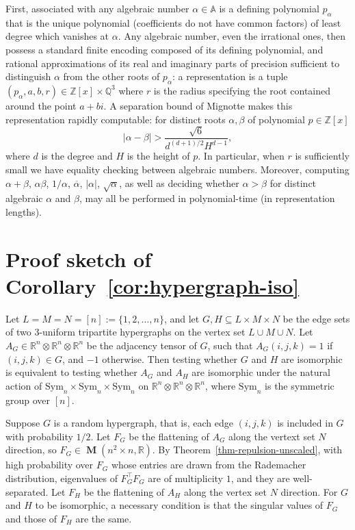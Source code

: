 \documentclass[11pt]{article}
\numberwithin{equation}{section}
\theoremstyle{remark}
\DeclareMathOperator{\M}{\textbf{M}}
\renewcommand{\AA}{\mathbb{A}}
\newcommand{\RR}{\mathbb{R}}
\newcommand{\Sym}{\mathrm{Sym}}
\begin{document}
First, associated with any algebraic number $\alpha \in \AA$ is a defining polynomial $p_\alpha$ that is the unique polynomial (coefficients do not have common factors) of least degree which vanishes at $\alpha$. Any algebraic number, even the irrational ones, then possess a standard finite encoding composed of its defining polynomial, and rational approximations of its real and imaginary parts of precision sufficient to distinguish $\alpha$ from the other roots of $p_\alpha$: a representation is a tuple $(p_\alpha, a, b, r) \in \mathbb{Z}[x] \times \mathbb{Q}^3$ where $r$ is the radius specifying the root contained around the point $a+bi$. A separation bound of Mignotte \cite{mignotte1982some} makes this representation rapidly computable:
for distinct roots $\alpha, \beta$ of polynomial $p \in \mathbb{Z}[x]$
\[
|\alpha - \beta| > \frac{\sqrt{6}}{d^{(d+1)/2}H^{d-1}},
\]
where $d$ is the degree and $H$ is the height of $p$. In particular, when $r$ is sufficiently small we have equality checking between algebraic numbers. Moreover, computing $\alpha+\beta$, $\alpha\beta$, $1/\alpha$, $\overline{\alpha}$, $|\alpha|$, $\sqrt{\alpha}$, as well as deciding whether $\alpha > \beta$ for distinct algebraic $\alpha$ and $\beta$, may all be performed in polynomial-time (in representation lengths).

\section{Proof sketch of Corollary~\ref{cor:hypergraph-iso}}
\label{app:hypergraph-iso}

Let $L=M=N=[n]:=\{1, 2, \dots, n\}$, and let $G, H\subseteq L\times M\times N$ be the edge sets of two 3-uniform tripartite hypergraphs on the vertex set $L\cup M\cup N$. Let $A_G\in \RR^n\otimes\RR^n\otimes\RR^n$ be the adjacency tensor of $G$, such that $A_G(i, j, k)=1$ if $(i, j, k)\in G$, and $-1$ otherwise. Then testing whether $G$ and $H$ are isomorphic is equivalent to testing whether $A_G$ and $A_H$ are isomorphic under the natural action of $\Sym_n\times\Sym_n\times\Sym_n$ on $\RR^n\otimes\RR^n\otimes\RR^n$, where $\Sym_n$ is the symmetric group over $[n]$.

Suppose $G$ is a random hypergraph, that is, each edge $(i, j, k)$ is included in $G$ with probability $1/2$. Let $F_G$ be the flattening of $A_G$ along the vertext set $N$ direction, so $F_G\in \M(n^2\times n, \RR)$. By Theorem~\ref{thm-repulsion-unscaled}, with high probability over $F_G$ whose entries are drawn from the Rademacher distribution, eigenvalues of $F_G^\top F_G$ are of multiplicity $1$, and they are well-separated. Let $F_H$ be the flattening of $A_H$ along the vertex set $N$ direction. For $G$ and $H$ to be isomorphic, a necessary condition is that the singular values of $F_G$ and those of $F_H$ are the same. 
\end{document}
